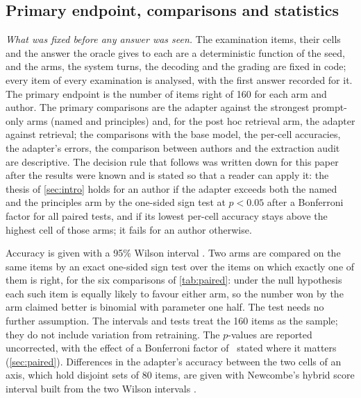\subsection{Primary endpoint, comparisons and statistics}\label{sec:stats}

\emph{What was fixed before any answer was seen.} The examination items, their cells and the
answer the oracle gives to each are a deterministic function of the seed, and the arms, the
system turns, the decoding and the grading are fixed in code; every item of every examination is analysed, with the first
answer recorded for it. The
primary endpoint is the number of items right of 160 for each arm and author. The primary
comparisons are the adapter against the strongest prompt-only arms (named and principles)
and, for the post hoc retrieval arm, the adapter against retrieval; the comparisons with the
base model, the per-cell accuracies, the adapter's errors, the comparison between authors and
the extraction audit are descriptive. The decision rule that follows was written down for this
paper after the results were known and is stated so that a reader can apply it: the thesis of
\cref{sec:intro} holds for an author if the adapter exceeds both the named and the principles
arm by the one-sided sign test at $p<0.05$ after a Bonferroni factor for all paired tests, and
if its lowest per-cell accuracy stays above the highest cell of those arms; it fails for an
author otherwise.

Accuracy is given with a 95\% Wilson interval \citep{wilson1927probable}. Two arms are
compared on the same items by an exact one-sided sign test over the items on which exactly one
of them is right, for the six comparisons of \cref{tab:paired}: under the null hypothesis each
such item is equally likely to favour either arm, so the number won by the arm claimed better
is binomial with parameter one half. The test needs no further assumption. The intervals and
tests treat the 160 items as the sample; they do not include variation from retraining. The
$p$-values are reported uncorrected, with the effect of a Bonferroni factor of \PairedTests\
stated where it matters (\cref{sec:paired}). Differences in the adapter's accuracy between the
two cells of an axis, which hold disjoint sets of 80 items, are given with Newcombe's hybrid
score interval built from the two Wilson intervals \citep{newcombe1998interval}.
